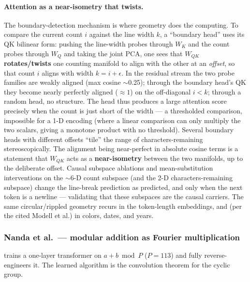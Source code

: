 \paragraph*{Attention as a near-isometry that twists.}
The boundary-detection mechanism is where geometry does the computing. To compare the current count $i$ against the line width $k$, a ``boundary head'' uses its QK bilinear form: pushing the line-width probes through $W_{K}$ and the count probes through $W_{Q}$ and taking the joint PCA, one sees that $W_{QK}$ \textbf{rotates/twists} one counting manifold to align with the other at an \emph{offset}, so that count $i$ aligns with width $k=i+\epsilon$. In the residual stream the two probe families are weakly aligned (max cosine $\sim$0.25); through the boundary head's QK they become nearly perfectly aligned ($\approx 1$) on the off-diagonal $i<k$; through a random head, no structure. The head thus produces a large attention score precisely when the count is just short of the width --- a thresholded comparison, impossible for a 1-D encoding (where a linear comparison can only multiply the two scalars, giving a monotone product with no threshold). Several boundary heads with different offsets ``tile'' the range of characters-remaining stereoscopically. The alignment being near-perfect in absolute cosine terms is a statement that $W_{QK}$ acts as a \textbf{near-isometry} between the two manifolds, up to the deliberate offset. Causal subspace ablations and mean-substitution interventions on the $\sim$6-D count subspace (and the 2-D characters-remaining subspace) change the line-break prediction as predicted, and only when the next token is a newline --- validating that these subspaces are the causal carriers. The same circular/rippled geometry recurs in the token-length embeddings, and (per the cited Modell et al.) in colors, dates, and years.

\subsubsection*{Nanda et al.\ --- modular addition as Fourier multiplication}

\textcite{progress-measures-for-grokking} trains a one-layer transformer on $a+b \bmod P$ ($P=113$) and fully reverse-engineers it. The learned algorithm is the convolution theorem for the cyclic group.

